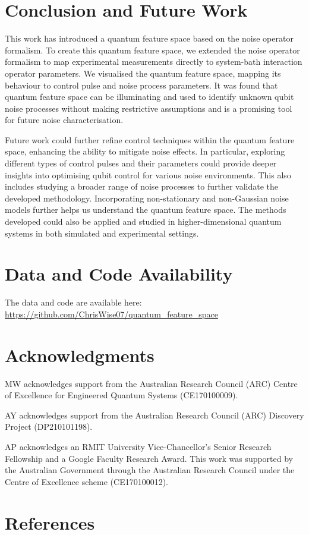 \documentclass[12pt]{iopart}
\begin{document}
\section{Conclusion and Future Work \label{sec:conclusion_and_future_work}}
This work has introduced a quantum feature space based on the noise operator formalism. To create this quantum feature space, we extended the noise operator formalism to map experimental measurements directly to system-bath interaction operator parameters. We visualised the quantum feature space, mapping its behaviour to control pulse and noise process parameters. It was found that quantum feature space can be illuminating and used to identify unknown qubit noise processes without making restrictive assumptions and is a promising tool for future noise characterisation.

Future work could further refine control techniques within the quantum feature space, enhancing the ability to mitigate noise effects. In particular, exploring different types of control pulses and their parameters could provide deeper insights into optimising qubit control for various noise environments. This also includes studying a broader range of noise processes to further validate the developed methodology. Incorporating non-stationary and non-Gaussian noise models further helps us understand the quantum feature space. The methods developed could also be applied and studied in higher-dimensional quantum systems in both simulated and experimental settings.

\section{Data and Code Availability \label{sec:data_and_code_availability}}
The data and code are available here:
\\
\url{https://github.com/ChrisWise07/quantum_feature_space}
\section*{Acknowledgments \label{sec:acknowledgments}}
MW acknowledges support from the Australian Research Council (ARC) Centre of Excellence for Engineered Quantum Systems (CE170100009).

AY acknowledges support from the Australian Research Council (ARC) Discovery Project (DP210101198).

AP acknowledges an RMIT University Vice-Chancellor's Senior Research Fellowship and a Google Faculty Research Award. This work was supported by the Australian Government through the Australian Research Council under the Centre of Excellence scheme (CE170100012).
\section{References}


\end{document}
